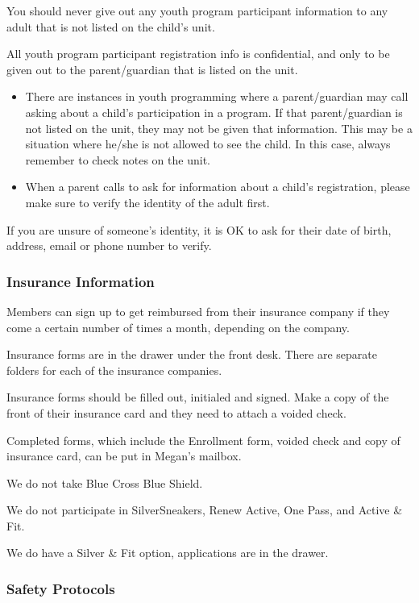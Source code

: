 \documentclass[
]{report}
\begin{document}
You should never give out any youth program participant information to
any adult that is not listed on the child's unit.

All youth program participant registration info is confidential, and
only to be given out to the parent/guardian that is listed on the unit.

\begin{itemize}
\item
  There are instances in youth programming where a parent/guardian may
  call asking about a child's participation in a program. If that
  parent/guardian is not listed on the unit, they may not be given that
  information. This may be a situation where he/she is not allowed to
  see the child. In this case, always remember to check notes on the
  unit.
\item
  When a parent calls to ask for information about a child's
  registration, please make sure to verify the identity of the adult
  first.
\end{itemize}

If you are unsure of someone's identity, it is OK to ask for their date
of birth, address, email or phone number to verify.

\hypertarget{insurance-information}{%
\subsubsection{Insurance Information}\label{insurance-information}}

Members can sign up to get reimbursed from their insurance company if
they come a certain number of times a month, depending on the company.

Insurance forms are in the drawer under the front desk. There are
separate folders for each of the insurance companies.

Insurance forms should be filled out, initialed and signed. Make a copy
of the front of their insurance card and they need to attach a voided
check.

Completed forms, which include the Enrollment form, voided check and
copy of insurance card, can be put in Megan's mailbox.

We do not take Blue Cross Blue Shield.

We do not participate in SilverSneakers, Renew Active, One Pass, and
Active \& Fit.

We do have a Silver \& Fit option, applications are in the drawer.

\hypertarget{safety-protocols}{%
\subsubsection{Safety Protocols}\label{safety-protocols}}
\end{document}
